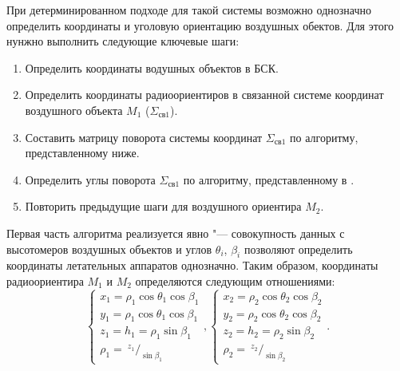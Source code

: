 \documentclass[a4paper,12pt]{article}
\begin{document}
При детерминированном подходе для такой системы возможно однозначно определить координаты
и уголовую ориентацию воздушных обектов. Для этого нунжно выполнить следующие ключевые шаги:
\begin{enumerate}
    \item Определить координаты водушных объектов в БСК.
    \item Определить координаты радиоориентиров в связанной системе координат воздушного объекта $M_1$ ($\Sigma_{\text{св}1}$).
    \item Составить матрицу поворота системы координат $\Sigma_{\text{св}1}$ по алгоритму, представленному ниже.
    \item Определить углы поворота $\Sigma_{\text{св}1}$ по алгоритму, представленному в \cite{antennas}.
    \item Повторить предыдущие шаги для воздушного ориентира $M_2$.
\end{enumerate}

Первая часть алгоритма реализуется явно "--- совокупность данных с высотомеров воздушных
объектов и углов $\theta_i$, $\beta_i$ позволяют определить координаты летательных
аппаратов однозначно. Таким образом, координаты радиоориентира $M_1$ и $M_2$ определяются следующим
отношениями:
\begin{equation}
    \begin{cases}
        x_1 = \rho_1 \cos\theta_1 \cos\beta_1 \\
        y_1 = \rho_1 \cos\theta_1 \cos\beta_1 \\
        z_1 = h_1 = \rho_1 \sin\beta_1 \\
        \rho_1 = ~^{z_1}/_{\sin\beta_1}
    \end{cases},
    \begin{cases}
        x_2 = \rho_2 \cos\theta_2 \cos\beta_2 \\
        y_2 = \rho_2 \cos\theta_2 \cos\beta_2 \\
        z_2 = h_2 = \rho_2 \sin\beta_2 \\
        \rho_2 = ~^{z_2}/_{\sin\beta_2}
    \end{cases}.
\end{equation}
\end{document}

